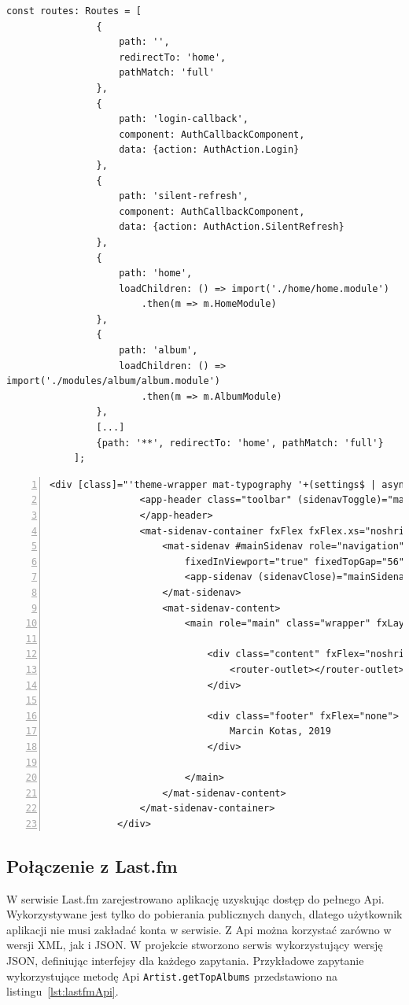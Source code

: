 		\begin{lstlisting}[label=lst:routing, caption=Trasy głównego modułu]
			const routes: Routes = [
				{
					path: '',
					redirectTo: 'home',
					pathMatch: 'full'
				},
				{
					path: 'login-callback',
					component: AuthCallbackComponent,
					data: {action: AuthAction.Login}
				},
				{
					path: 'silent-refresh',
					component: AuthCallbackComponent,
					data: {action: AuthAction.SilentRefresh}
				},
				{
					path: 'home',
					loadChildren: () => import('./home/home.module')
						.then(m => m.HomeModule)
				},
				{
					path: 'album',
					loadChildren: () => import('./modules/album/album.module')
						.then(m => m.AlbumModule)
				},
				[...]
				{path: '**', redirectTo: 'home', pathMatch: 'full'}
			];
		\end{lstlisting}

		\begin{lstlisting}[label=lst:appComponent, caption=Główny szablon HTML aplikacji, numbers=left, numberstyle=\tiny, stepnumber=2, float=h]
			<div [class]="'theme-wrapper mat-typography '+(settings$ | async)?.theme">
				<app-header class="toolbar" (sidenavToggle)="mainSidenav.toggle()">
				</app-header>
				<mat-sidenav-container fxFlex fxFlex.xs="noshrink">
					<mat-sidenav #mainSidenav role="navigation" mode="over"
						fixedInViewport="true" fixedTopGap="56">
						<app-sidenav (sidenavClose)="mainSidenav.close()"></app-sidenav>
					</mat-sidenav>			
					<mat-sidenav-content>
						<main role="main" class="wrapper" fxLayout="column">
			
							<div class="content" fxFlex="noshrink">
								<router-outlet></router-outlet>
							</div>
			
							<div class="footer" fxFlex="none">
								Marcin Kotas, 2019
							</div>
			
						</main>
					</mat-sidenav-content>
				</mat-sidenav-container>
			</div>	
		\end{lstlisting}

	\subsection{Połączenie z Last.fm}
		W serwisie Last.fm zarejestrowano aplikację uzyskując dostęp do pełnego Api.
		Wykorzystywane jest tylko do pobierania publicznych danych, dlatego użytkownik aplikacji nie musi zakładać konta w serwisie.
		Z Api można korzystać zarówno w wersji XML, jak i JSON.
		W projekcie stworzono serwis wykorzystujący wersję JSON, definiując interfejsy dla każdego zapytania.
		Przykładowe zapytanie wykorzystujące metodę Api \verb|Artist.getTopAlbums| przedstawiono na listingu~\ref{lst:lastfmApi}.

